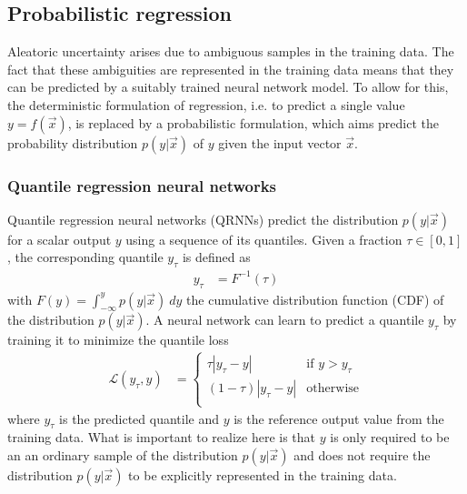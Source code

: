 \subsection{Probabilistic regression}

Aleatoric uncertainty arises due to ambiguous samples in the training data. The
fact that these ambiguities are represented in the training data means that they
can be predicted by a suitably trained neural network model. To allow for this,
the deterministic formulation of regression, i.e. to predict a single value $y =
f(\vec{x})$, is replaced by a probabilistic formulation, which aims predict the
probability distribution $p(y|\vec{x})$ of $y$ given the input vector $\vec{x}$.

\subsubsection{Quantile regression neural networks}


Quantile regression neural networks (QRNNs) predict the distribution
$p(y|\vec{x})$ for a scalar output $y$ using a sequence of its quantiles. Given
a fraction $\tau \in [0, 1]$, the corresponding quantile $y_\tau$ is defined as
\begin{align}
  y_\tau &= F^{-1}(\tau)
\end{align}
with $F(y) = \int_{-\infty}^y p(y|\vec{x})\ dy$ the cumulative distribution
function (CDF) of the distribution $p(y|\vec{x})$. A neural network can learn to predict a quantile
$y_\tau$ by training it to minimize the quantile loss
\begin{align}
  \mathcal{L}(y_\tau, y) &=
  \begin{cases}
    \tau  |y_\tau - y| & \text{if } y > y_\tau \\
    (1 - \tau)  |y_\tau - y| & \text{otherwise} \\
    \end{cases}
\end{align}
where $y_\tau$ is the predicted quantile and $y$ is the reference output value
from the training data. What is important to realize here is that $y$ is only
required to be an an ordinary sample of the distribution $p(y|\vec{x})$ and does not
require the distribution $p(y|\vec{x})$ to be explicitly represented in the
training data.

